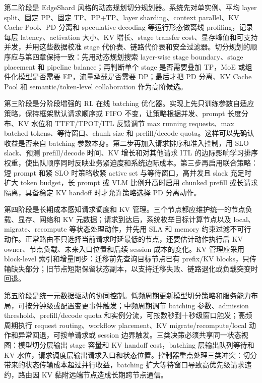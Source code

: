 第二阶段是 EdgeShard 风格的动态规划切分规划器。系统先对单实例、平均 layer split、固定 PP、固定 TP、PP+TP、layer sharding、context parallel、KV Cache Pool、PD 分离和 speculative decoding 等运行形态做离线 profiling，记录每层 latency、activation 大小、KV 增长、stage transfer cost、显存峰值和可支持并发，并用这些数据校准 stage 代价表、链路代价表和安全过滤器。切分规划的顺序应与第四章保持一致：先用动态规划搜索 layer-wise stage boundary、stage placement 和 pipeline balance；再判断单个 stage 是否需要叠加 TP，MoE 或组件化模型是否需要 EP，流量承载是否需要 DP；最后才把 PD 分离、KV Cache Pool 和 semantic/token-level collaboration 作为高阶候选。

第三阶段是分阶段增强的 RL 在线 batching 优化器。实现上先只训练参数自适应策略，保持框架默认请求顺序或 FIFO 不变，让策略根据并发、prompt 长度分布、KV 水位和 TTFT/TPOT/ITL 反馈调节 max running requests、max batched tokens、等待窗口、chunk size 和 prefill/decode quota。这样可以先确认收益是否来自 batching 参数本身。第二步再加入请求排序和准入控制，用 SLO slack、预测 prefill/decode 时间、KV 增长和对其他请求 ITL 的边际影响学习排序权重，使出队顺序同时反映业务紧迫度和系统边际成本。第三步再启用联合策略：短 prompt 和紧 SLO 时策略收紧 active set 与等待窗口，高并发且 slack 充足时扩大 token budget，长 prompt 或 VLM 比例升高时启用 chunked prefill 或长请求隔离，具备稳定 KV handoff 时才允许策略选择 PD 分离动作。

第四阶段是长期成本感知请求调度和 KV 管理。三个节点都应维护统一的节点负载、显存、网络和 KV 元数据；请求到达后，系统枚举目标计算节点以及 local、migrate、recompute 等状态处理动作，并先用 SLA 和 memory 约束过滤不可行动作。正常路由不只选择当前请求时延最低的节点，还要估计动作执行后 KV owner、节点负载、未来入口位置和后续 session 成本的变化。KV 管理应采用 block-level 索引和增量同步：迁移前先查询目标节点已有 prefix/KV blocks，只传输缺失部分；旧节点短期保留状态副本，以支持迁移失败、链路退化或负载突变时回退。

第五阶段是统一元数据驱动的协同控制。低频周期更新模型切分策略和服务能力布局，可按分钟级或配置变更事件触发；中频周期调节 batching 参数、admission threshold、prefill/decode quota 和实例分流，可按数秒到十秒级窗口触发；高频周期执行 request routing、workflow placement、KV migrate/recompute/local 动作和异常回退，可按单请求或 session 边界触发。三类决策必须共享同一状态视图：模型切分层输出 stage 容量和 KV handoff cost，batching 层输出队列等待和 KV 水位，请求调度层输出请求入口和状态位置。控制器重点处理三类冲突：切分带来的状态传输成本超过并行收益，batching 扩大等待窗口导致高优先级请求违约，路由因 KV 黏附远端节点造成长期跨节点通信。

